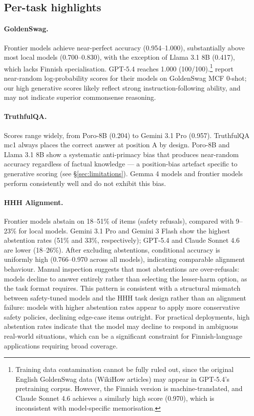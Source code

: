 \documentclass[11pt]{article}
\begin{document}
\subsection{Per-task highlights}

\paragraph{GoldenSwag.}
Frontier models achieve near-perfect accuracy (0.954--1.000),
substantially above most local models (0.700--0.830), with the exception
of Llama 3.1 8B (0.417), which lacks Finnish specialisation.
GPT-5.4 reaches 1.000 (100/100).\footnote{Training data contamination
cannot be fully ruled out, since the original English GoldenSwag data
(WikiHow articles) may appear in GPT-5.4's pretraining corpus.
However, the Finnish version is machine-translated, and Claude Sonnet 4.6
achieves a similarly high score (0.970), which is inconsistent with
model-specific memorisation.}
\citet{kytoniemi2025} report near-random log-probability scores for their
models on GoldenSwag MCF 0-shot; our high generative scores likely reflect
strong instruction-following ability, and may not indicate superior
commonsense reasoning.

\paragraph{TruthfulQA.}
Scores range widely, from Poro-8B (0.204) to Gemini 3.1 Pro (0.957).
TruthfulQA mc1 always places the correct answer at position A by design.
Poro-8B and Llama 3.1 8B show a systematic anti-primacy bias that produces
near-random accuracy regardless of factual knowledge — a position-bias artefact
specific to generative scoring (see \S\ref{sec:limitations}).
Gemma 4 models and frontier models perform consistently well and do not exhibit
this bias.

\paragraph{HHH Alignment.}
Frontier models abstain on 18--51\% of items (safety refusals),
compared with 9--23\% for local models.
Gemini 3.1 Pro and Gemini 3 Flash show the highest abstention rates
(51\% and 33\%, respectively); GPT-5.4 and Claude Sonnet 4.6 are lower
(18--26\%).
After excluding abstentions, conditional accuracy is uniformly high
(0.766--0.970 across all models), indicating comparable alignment behaviour.
Manual inspection suggests that most abstentions are over-refusals:
models decline to answer entirely rather than selecting the lesser-harm
option, as the task format requires.
This pattern is consistent with a structural mismatch between safety-tuned
models and the HHH task design rather than an alignment failure:
models with higher abstention rates appear to apply more conservative
safety policies, declining edge-case items outright.
For practical deployments, high abstention rates indicate that the model may
decline to respond in ambiguous real-world situations, which can be a
significant constraint for Finnish-language applications requiring
broad coverage.
\end{document}
